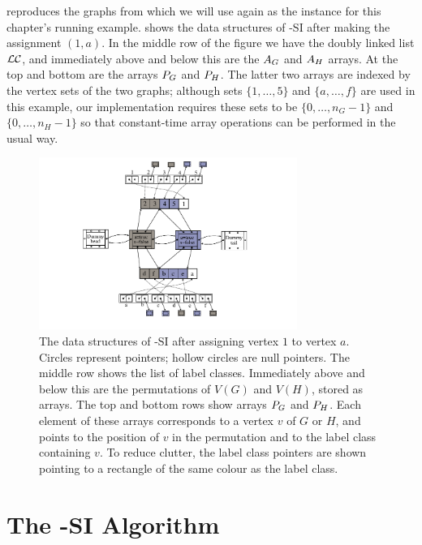  reproduces the graphs from
 which we will use again as the instance for this
chapter's running example.   shows the data
structures of \McSplit-SI after making the assignment $(1,a)$.  In the middle
row of the figure we have the doubly linked list $\mathcal{LC}$, and immediately
above and below this are the $A_G$ and $A_H$ arrays.  At the top and
bottom are the arrays $P_G$ and $P_H$.  The latter two arrays are indexed
by the vertex sets of the two graphs; although sets $\{1,\dots,5\}$ and
$\{a,\dots,f\}$ are used in this example, our implementation requires these sets to be
$\{0, \dots, n_G-1\}$ and $\{0, \dots, n_H-1\}$ so that constant-time array
operations can be performed in the usual way.


\begin{figure}[htb]
    \centering
    \includegraphics*[width=0.75\textwidth]{14b-mcsplit-induced-si/figs/data-structure-step-1}
    \caption{The data structures of \McSplit-SI after assigning vertex $1$ to vertex $a$.
        Circles represent pointers; hollow circles are null pointers.  The middle row shows
        the list of label classes.  Immediately above and below this are the
        permutations of $V(G)$ and $V(H)$, stored as arrays.  The top and bottom rows
        show arrays $P_G$ and $P_H$.  Each element of these arrays
        corresponds to a vertex $v$ of $G$ or $H$, and points to the position of $v$ in
        the permutation and to the label class containing $v$.  To reduce clutter,
        the label class pointers are shown pointing to a rectangle of the same colour as the
        label class.}
    \label{figure:si-data-structures}
\end{figure}

\FloatBarrier

\section{The \McSplit-SI Algorithm}\label{sec:mcsplit-si-algorithm}

